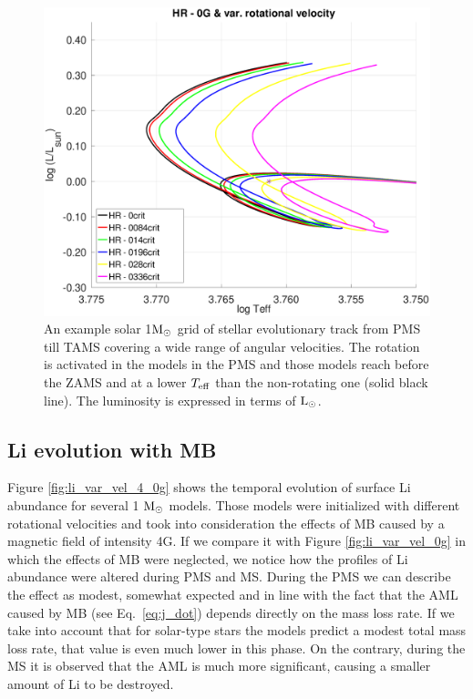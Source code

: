 \documentclass[fleqn,usenatbib]{mnras}
\begin{document}
\begin{figure}
	\includegraphics[trim = 10mm 10mm 15mm 10mm, clip,width=\columnwidth]{figures/hr_var_vel_0_0g_z1.eps}
    \caption{An example solar 1$\mathrm{M}_\odot$ grid of stellar evolutionary track from PMS till TAMS covering a wide range of angular velocities. The rotation is activated in the models in the PMS and those models reach before the ZAMS and at a lower $T_{\mathrm{eff}}$ than the non-rotating one (solid black line). The luminosity is expressed in terms of $\mathrm{L}_\odot$.}
    \label{fig:hr_var_vel_0g}
\end{figure}

\subsection{Li evolution with MB}
Figure \ref{fig:li_var_vel_4_0g} shows the temporal evolution of surface Li abundance for several 1 $\mathrm{M}_\odot$ models. Those models were initialized with different rotational velocities and took into consideration the effects of MB caused by a magnetic field of intensity 4G. If we compare it with Figure \ref{fig:li_var_vel_0g} in which the effects of MB were neglected, we notice how the profiles of Li abundance were altered during PMS and MS. During the PMS we can describe the effect as modest, somewhat expected and in line with the fact that the AML caused by MB (see Eq.~\ref{eq:j_dot}) depends directly on the mass loss rate. If we take into account that for solar-type stars the models predict a modest total mass loss rate, that value is even much lower in this phase. On the contrary, during the MS it is observed that the AML is much more significant, causing a smaller amount of Li to be destroyed.\par
\end{document}
